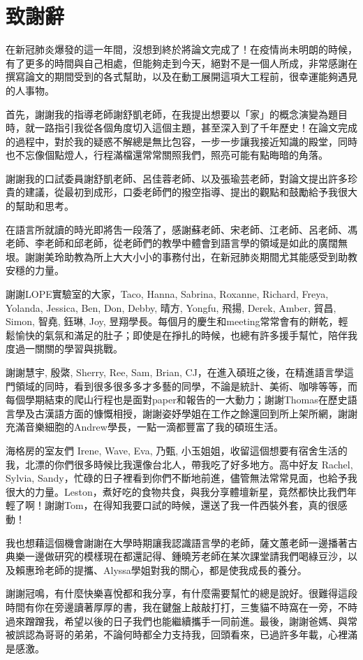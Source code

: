 

\chapter*{致謝辭}
在新冠肺炎爆發的這一年間，沒想到終於將論文完成了！在疫情尚未明朗的時候，有了更多的時間與自己相處，但能夠走到今天，絕對不是一個人所成，非常感謝在撰寫論文的期間受到的各式幫助，以及在動工展開這項大工程前，很幸運能夠遇見的人事物。

首先，謝謝我的指導老師謝舒凱老師，在我提出想要以「家」的概念演變為題目時，就一路指引我從各個角度切入這個主題，甚至深入到了千年歷史！在論文完成的過程中，對於我的疑惑不解總是無比包容，一步一步讓我接近知識的殿堂，同時也不忘像個點燈人，行程滿檔還常常關照我們，照亮可能有點晦暗的角落。

謝謝我的口試委員謝舒凱老師、呂佳蓉老師、以及張瑜芸老師，對論文提出許多珍貴的建議，從最初到成形，口委老師們的撥空指導、提出的觀點和鼓勵給予我很大的幫助和思考。

在語言所就讀的時光即將吿一段落了，感謝蘇老師、宋老師、江老師、呂老師、馮老師、李老師和邱老師，從老師們的教學中體會到語言學的領域是如此的廣闊無垠。謝謝美玲助教為所上大大小小的事務付出，在新冠肺炎期間尤其能感受到助教安穩的力量。

謝謝LOPE實驗室的大家，Taco, Hanna, Sabrina, Roxanne, Richard, Freya, Yolanda, Jessica, Ben, Don, Debby, 晴方, Yongfu, 飛揚, Derek, Amber, 貿昌, Simon, 智堯, 鈺琳, Joy, 昱翔學長。每個月的慶生和meeting常常會有的餅乾，輕鬆愉快的氣氛和滿足的肚子；即使是在掙扎的時候，也總有許多援手幫忙，陪伴我度過一關關的學習與挑戰。

謝謝慧宇, 殷綮, Sherry, Ree, Sam, Brian, CJ，在進入碩班之後，在精進語言學這門領域的同時，看到很多很多多才多藝的同學，不論是統計、美術、咖啡等等，而每個學期結束的爬山行程也是面對paper和報告的一大動力；謝謝Thomas在歷史語言學及古漢語方面的慷慨相授，謝謝姿妤學姐在工作之餘還回到所上架所網，謝謝充滿音樂細胞的Andrew學長，一點一滴都豐富了我的碩班生活。

海格房的室友們 Irene, Wave, Eva, 乃甄, 小玉姐姐，收留這個想要有宿舍生活的我，北漂的你們很多時候比我還像台北人，帶我吃了好多地方。高中好友 Rachel, Sylvia, Sandy，忙碌的日子裡看到你們不斷地前進，儘管無法常常見面，也給予我很大的力量。Leston，煮好吃的食物共食，與我分享體壇新星，竟然都快比我們年輕了啊！謝謝Tom，在得知我要口試的時候，還送了我一件西裝外套，真的很感動！

我也想藉這個機會謝謝在大學時期讓我認識語言學的老師，薩文蕙老師一邊播著古典樂一邊做研究的模樣現在都還記得、鍾曉芳老師在某次課堂請我們喝綠豆沙，以及賴惠玲老師的提攜、Alyssa學姐對我的關心，都是使我成長的養分。

謝謝冠鳴，有什麼快樂喜悅都和我分享，有什麼需要幫忙的總是說好。很難得這段時間有你在旁邊讀著厚厚的書，我在鍵盤上敲敲打打，三隻貓不時窩在一旁，不時過來蹭蹭我，希望以後的日子我們也能繼續攜手一同前進。最後，謝謝爸媽、與常被誤認為哥哥的弟弟，不論何時都全力支持我，回頭看來，已過許多年載，心裡滿是感激。

